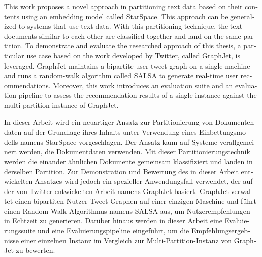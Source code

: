 
\null\vfil
\begin{otherlanguage}{english}
\begin{center}\textsf{\textbf{\abstractname}}\end{center}

\noindent This work proposes a novel approach in partitioning text data based on their contents using an embedding model called StarSpace. This approach can be generalized to systems that use text data. With this partitioning technique, the text documents similar to each other are classified together and land on the same partition. To demonstrate and evaluate the researched approach of this thesis, a particular use case based on the work developed by Twitter, called GraphJet, is leveraged. GraphJet maintains a bipartite user-tweet graph on a single machine and runs a random-walk algorithm called SALSA to generate real-time user recommendations. Moreover, this work introduces an evaluation suite and an evaluation pipeline to assess the recommendation results of a single instance against the multi-partition instance of GraphJet.

\end{otherlanguage}
\vfil\null



\null\vfil
\begin{otherlanguage}{ngerman}
\begin{center}\textsf{\textbf{\abstractname}}\end{center}

\noindent In dieser Arbeit wird ein neuartiger Ansatz zur Partitionierung von Dokumentendaten auf der Grundlage ihres Inhalts unter Verwendung eines Einbettungsmodells namens StarSpace vorgeschlagen. Der Ansatz kann auf Systeme verallgemeinert werden, die Dokumentdaten verwenden. Mit dieser Partitionierungstechnik werden die einander ähnlichen Dokumente gemeinsam klassifiziert und landen in derselben Partition. Zur Demonstration und Bewertung des in dieser Arbeit entwickelten Ansatzes wird jedoch ein spezieller Anwendungsfall verwendet, der auf der von Twitter entwickelten Arbeit namens GraphJet basiert. GraphJet verwaltet einen bipartiten Nutzer-Tweet-Graphen auf einer einzigen Maschine und führt einen Random-Walk-Algorithmus namens SALSA aus, um Nutzerempfehlungen in Echtzeit zu generieren. Darüber hinaus werden in dieser Arbeit eine Evaluierungssuite und eine Evaluierungspipeline eingeführt, um die Empfehlungsergebnisse einer einzelnen Instanz im Vergleich zur Multi-Partition-Instanz von GraphJet zu bewerten.

\end{otherlanguage}
\vfil\null



